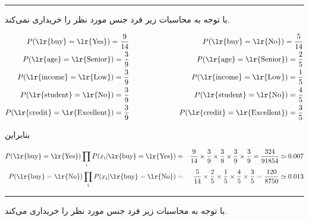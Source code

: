 \documentclass{article}
\begin{document}
\begin{center}
\rule{0.5\linewidth}{0.1pt}
\end{center}

با توجه به محاسبات زیر فرد  جنس مورد نظر را خریداری نمی‌کند.

\begin{eqnarray*}
    P(\text{\lr{buy}}=\text{\lr{Yes}}) = \frac{9}{14} & \hspace{2cm} & P(\text{\lr{buy}}=\text{\lr{No}}) = \frac{5}{14}\\
    P(\text{\lr{age}}=\text{\lr{Senior}}) = \frac{3}{9} & \hspace{2cm} & P(\text{\lr{age}}=\text{\lr{Senior}}) = \frac{2}{5}\\
    P(\text{\lr{income}}=\text{\lr{Low}}) = \frac{3}{9} & \hspace{2cm} & P(\text{\lr{income}}=\text{\lr{Low}}) = \frac{1}{5}\\
    P(\text{\lr{student}}=\text{\lr{No}}) = \frac{3}{9} & \hspace{2cm} & P(\text{\lr{student}}=\text{\lr{No}}) = \frac{4}{5}\\
    P(\text{\lr{credit}}=\text{\lr{Excellent}}) = \frac{3}{9} & \hspace{2cm} & P(\text{\lr{credit}}=\text{\lr{Excellent}}) = \frac{3}{5}\\
\end{eqnarray*}

بنابراین

\begin{eqnarray*}
    P(\text{\lr{buy}}=\text{\lr{Yes}})\prod_{i} P(x_i|\text{\lr{buy}}=\text{\lr{Yes}}) & = &  \frac{9}{14} \times \frac{3}{9} \times \frac{3}{9} \times \frac{3}{9} \times \frac{3}{9} =  \frac{324}{91854} \simeq 0.007\\
    P(\text{\lr{buy}}=\text{\lr{No}})\prod_{i} P(x_i|\text{\lr{buy}}=\text{\lr{No}})  & = & \frac{5}{14} \times \frac{2}{5} \times \frac{1}{5} \times \frac{4}{5} \times \frac{3}{5} = \frac{120}{8750} \simeq 0.013
\end{eqnarray*}

\begin{center}
\rule{0.5\linewidth}{0.1pt}
\end{center}

با توجه به محاسبات زیر فرد  جنس مورد نظر را خریداری می‌کند.
\end{document}
